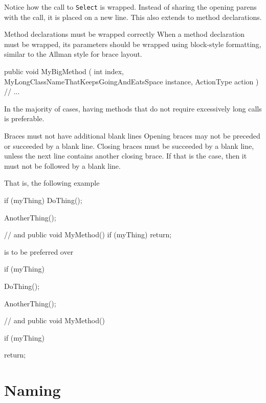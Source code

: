 \documentclass[11pt,a4paper]{article}
\begin{document}
Notice how the call to \texttt{Select} is wrapped. Instead of sharing the opening parens with the call, it is placed on a new line. This also extends to method declarations.

\begin{must}{Method declarations must be wrapped correctly}
When a method declaration must be wrapped, its parameters should be wrapped using block-style formatting, similar to the Allman style for brace layout.
\end{must}

\begin{code}
public void MyBigMethod
(
    int index,
    MyLongClassNameThatKeepsGoingAndEatsSpace instance,
    ActionType action
)
{
    // ...
}
\end{code}

In the majority of cases, having methods that do not require excessively long calls is preferable.

\begin{must}{Braces must not have additional blank lines}
Opening braces may not be preceded or succeeded by a blank line.
Closing braces must be succeeded by a blank line, unless the next line contains another closing brace. If that is the case, then it must not be followed by a blank line.
\end{must}

That is, the following example 
\begin{code}
if (myThing)
{
    DoThing();
}

AnotherThing();

// and
public void MyMethod()
{
    if (myThing)
    {
        return;
    }
}
\end{code}

is to be preferred over

\begin{code}
if (myThing)
{

    DoThing();
}

AnotherThing();

// and
public void MyMethod()
{
    if (myThing)
    {
    
        return;
        
    }
    
}
\end{code}

\section{Naming}
\end{document}
